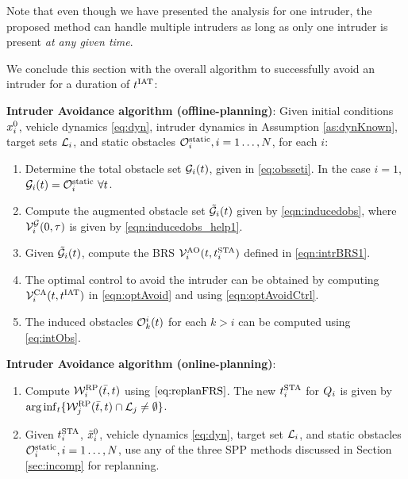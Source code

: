 \begin{remark}
Note that even though we have presented the analysis for one intruder, the proposed method can handle multiple intruders as long as only one intruder is present \textit{at any given time}. 
\end{remark}

We conclude this section with the overall algorithm to successfully avoid an intruder for a duration of $t^\text{IAT}$: 
\begin{alg}
\label{alg:intruder}
\textbf{Intruder Avoidance algorithm (offline-planning)}: Given initial conditions $x_i^0$, vehicle dynamics \eqref{eq:dyn}, intruder dynamics in Assumption \ref{as:dynKnown}, target sets $\mathcal{L}_i$, and static obstacles $\mathcal{O}^\text{static}_i, i = 1\ldots, N$, for each $i$:
\begin{enumerate}
\item Determine the total obstacle set $\mathcal{G}_i(t)$, given in \eqref{eq:obsseti}. In the case $i=1$, $\mathcal{G}_i(t) = \mathcal{O}^\text{static}_i ~ \forall t$.
\item Compute the augmented obstacle set $\tilde{\mathcal{G}}_i(t)$ given by \eqref{eqn:inducedobs}, where $\mathcal{V}^{\mathcal{G}}_{i}(0, \tau)$ is given by \eqref{eqn:inducedobs_help1}.
\item Given $\tilde{\mathcal{G}}_i(t)$, compute the BRS $\mathcal{V}^{\text{AO}}_{i}(t, t^\text{STA}_i)$ defined in \eqref{eqn:intrBRS1}.
\item The optimal control to avoid the intruder can be obtained by computing $\mathcal{V}^{\text{CA}}_{i}(t, t^\text{IAT})$ in \eqref{eqn:optAvoid} and using \eqref{eqn:optAvoidCtrl}. 
\item The induced obstacles $\mathcal{O}_k^i(t)$ for each $k>i$ can be computed using \eqref{eq:intObs}.
\end{enumerate}

\textbf{Intruder Avoidance algorithm (online-planning)}:
\begin{enumerate}
\item Compute $\mathcal{W}_i^{\text{RP}}(\bar{t}, t)$ using $\eqref{eq:replanFRS}$. The new $t^\text{STA}_i$ for $Q_i$ is given by $\arg \inf_t \{ \mathcal{W}_j^{\text{RP}}(\bar{t}, t) \cap \mathcal{L}_j \neq \emptyset \}$.
\item Given $t^\text{STA}_i$, $\tilde{x}_i^0$, vehicle dynamics \eqref{eq:dyn}, target set $\mathcal{L}_i$, and static obstacles $\mathcal{O}^\text{static}_i, i = 1\ldots, N$, use any of the three SPP methods discussed in Section \ref{sec:incomp} for replanning. 
\end{enumerate}
\end{alg}